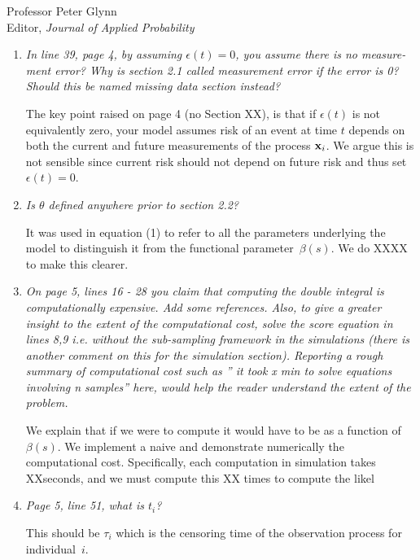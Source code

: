 \documentclass[11pt]{letter} %
\begin{document}
\begin{letter}{Professor
	Peter Glynn\\
	Editor, {\em Journal of Applied Probability}}
\begin{enumerate}
\vspace{5mm}
XXXXX
\vspace{5mm}

\item {\it In line 39, page 4, by assuming $\epsilon(t) = 0$, you assume there is no measure- ment error? Why is section 2.1 called measurement error if the error is 0? Should this be named missing data section instead?}

\vspace{5mm}
The key point raised on page 4 (no Section XX), is that if $\epsilon(t)$ is not equivalently zero, your model assumes risk of an event at time $t$ depends on both the current and future measurements of the process ${\bf x}_i$. We argue this is not sensible since current risk should not depend on future risk and thus set $\epsilon(t) = 0$.
\vspace{5mm}

\item  {\it Is $\theta$ defined anywhere prior to section 2.2?}

\vspace{5mm}
It was used in equation (1) to refer to all the parameters underlying the model to distinguish it from the functional parameter~$\beta (s)$.
We do XXXX to make this clearer.
\vspace{5mm}

\item {\it On page 5, lines 16 - 28 you claim that computing the double integral is computationally expensive. Add some references. Also, to give a greater insight to the extent of the computational cost, solve the score equation in lines 8,9 i.e. without the sub-sampling framework in the simulations (there is another comment on this for the simulation section). Reporting a rough summary of computational cost such as ” it took x min to solve equations involving n samples” here, would help the reader understand
the extent of the problem.}

\vspace{5mm}
We explain that if we were to compute it would have to be as a function of $\beta(s)$.  We implement a naive and demonstrate numerically the computational cost.  Specifically, each computation in simulation takes XXseconds, and we must compute this XX times to compute the likel
\vspace{5mm}

\item {\it Page 5, line 51, what is $t_i$?}

\vspace{5mm}
This should be $\tau_i$ which is the censoring time of the observation process for individual~$i$.
\vspace{5mm}


\end{enumerate}
\end{letter}
\end{document}
